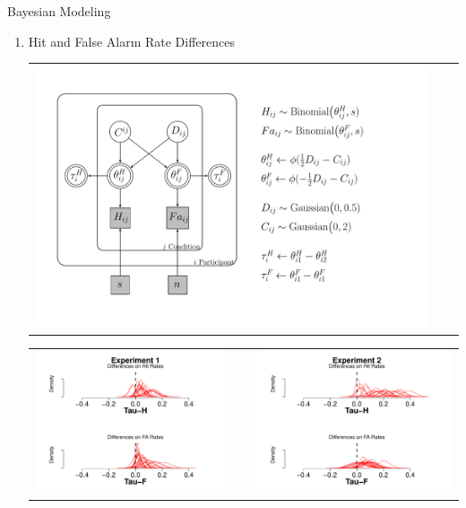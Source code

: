 \documentclass[final]{beamer}
\newlength{\onecolwid}
\newlength{\twocolwid}
\begin{document}
\begin{frame}[t]
\begin{columns}[t]
\begin{column}{\twocolwid}
\begin{columns}[t,totalwidth=\twocolwid]
\begin{column}{\onecolwid}
\begin{alertblock}{Bayesian Modeling}
\begin{enumerate}
\item Hit and False Alarm Rate Differences
\begin{center}
\begin{tabular}{ccc}
\includegraphics[width=0.68\linewidth]{Figures/Tau_DiffTeta_Model3.pdf}
\end{tabular}
\end{center}




\begin{tabular}{ccc}
\includegraphics[width=0.48\linewidth]{Figures/Tau_1.pdf} & \hfill & \includegraphics[width=0.48\linewidth]{Figures/Tau_2.pdf}
\end{tabular}



$\quad$
\end{enumerate}


\end{alertblock}
\end{column}
\end{columns}
\end{column}
\end{columns}
\end{frame}
\end{document}
